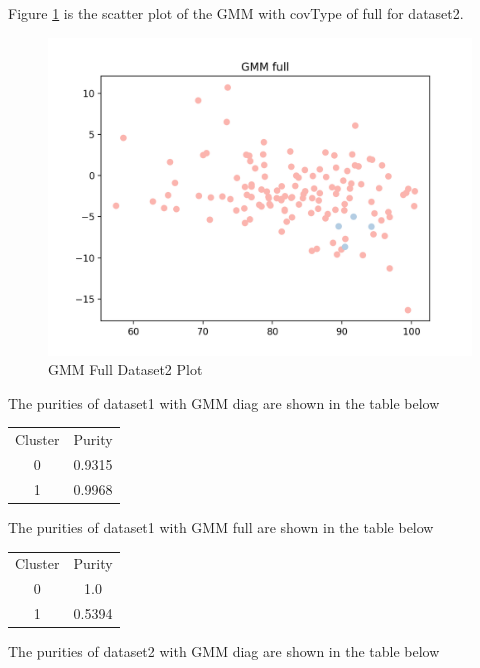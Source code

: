 \documentclass[11pt]{article}
\begin{document}
\begin{enumerate}
Figure \ref{fig:gmm_full_2} is the scatter plot of the GMM with covType of full for dataset2.

\begin{figure}[!h]
  \centering
  \includegraphics[width=\linewidth]{figures/gmm_full_2.png}
  \caption{GMM Full Dataset2 Plot}
  \label{fig:gmm_full_2}
\end{figure}


The purities of dataset1 with GMM diag are shown in the table below

\begin{center}
  \begin{tabular}{ |c|c| }
   \hline
   Cluster & Purity \\
   0 & 0.9315 \\
   1 & 0.9968 \\
   \hline
  \end{tabular}
\end{center}

The purities of dataset1 with GMM full are shown in the table below

\begin{center}
  \begin{tabular}{ |c|c| }
   \hline
   Cluster & Purity \\
   0 & 1.0 \\
   1 & 0.5394 \\
   \hline
  \end{tabular}
\end{center}

The purities of dataset2 with GMM diag are shown in the table below


\end{enumerate}
\end{document}
